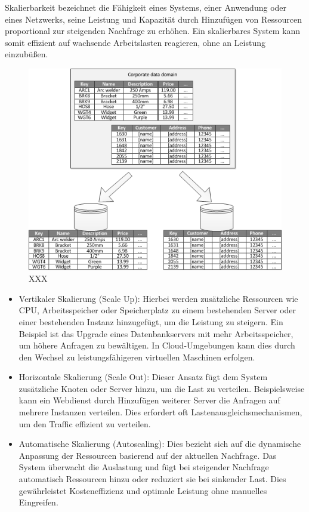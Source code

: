 
Skalierbarkeit bezeichnet die Fähigkeit eines Systems, einer Anwendung oder eines Netzwerks,
seine Leistung und Kapazität durch Hinzufügen von Ressourcen proportional zur steigenden Nachfrage zu erhöhen.
Ein skalierbares System kann somit effizient auf wachsende Arbeitslasten reagieren, ohne an Leistung einzubüßen.

\begin{figure}[t]
    \centering
    \includegraphics[width=\linewidth]{images/3}
    \caption{XXX}
    \label{fig:3}
\end{figure}

\begin{itemize}
    \item Vertikaler Skalierung (Scale Up): Hierbei werden zusätzliche Ressourcen wie CPU, Arbeitsspeicher oder Speicherplatz zu einem bestehenden Server oder einer bestehenden Instanz hinzugefügt, um die Leistung zu steigern. Ein Beispiel ist das Upgrade eines Datenbankservers mit mehr Arbeitsspeicher, um höhere Anfragen zu bewältigen. In Cloud-Umgebungen kann dies durch den Wechsel zu leistungsfähigeren virtuellen Maschinen erfolgen.
    \item Horizontale Skalierung (Scale Out): Dieser Ansatz fügt dem System zusätzliche Knoten oder Server hinzu, um die Last zu verteilen. Beispielsweise kann ein Webdienst durch Hinzufügen weiterer Server die Anfragen auf mehrere Instanzen verteilen. Dies erfordert oft Lastenausgleichsmechanismen, um den Traffic effizient zu verteilen.
    \item Automatische Skalierung (Autoscaling): Dies bezieht sich auf die dynamische Anpassung der Ressourcen basierend auf der aktuellen Nachfrage. Das System überwacht die Auslastung und fügt bei steigender Nachfrage automatisch Ressourcen hinzu oder reduziert sie bei sinkender Last. Dies gewährleistet Kosteneffizienz und optimale Leistung ohne manuelles Eingreifen.
\end{itemize}

